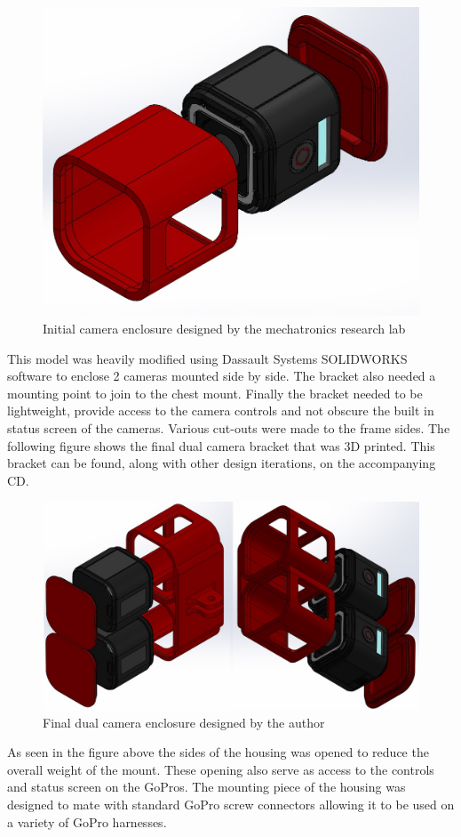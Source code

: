 \begin{figure}[!ht] 
\captionsetup{width=0.8\linewidth, font=small}  
\includegraphics[width=0.6\linewidth]{figures/sylvanexploded.JPG}
\caption{Initial camera enclosure designed by the mechatronics research lab}
\label{fig:sylvanexploded}
\end{figure}

This model was heavily modified using Dassault Systems SOLIDWORKS software to enclose 2 cameras mounted side by side. The bracket also needed a mounting point to join to the chest mount. Finally the bracket needed to be lightweight, provide access to the camera controls and not obscure the built in status screen of the cameras. Various cut-outs were made to the frame sides. The following figure shows the final dual camera bracket that was 3D printed. This bracket can be found, along with other design iterations, on the accompanying CD.

\begin{figure}[!ht] 
\captionsetup{width=0.8\linewidth, font=small}  
\includegraphics[width=0.55\linewidth]{figures/stereoholder.JPG}
\caption{Final dual camera enclosure designed by the author}
\label{fig:stereoholder}
\end{figure}

As seen in the figure above the sides of the housing was opened to reduce the overall weight of the mount. These opening also serve as access to the controls and status screen on the GoPros. The mounting piece of the housing was designed to mate with standard GoPro screw connectors allowing it to be used on a variety of GoPro harnesses. 

